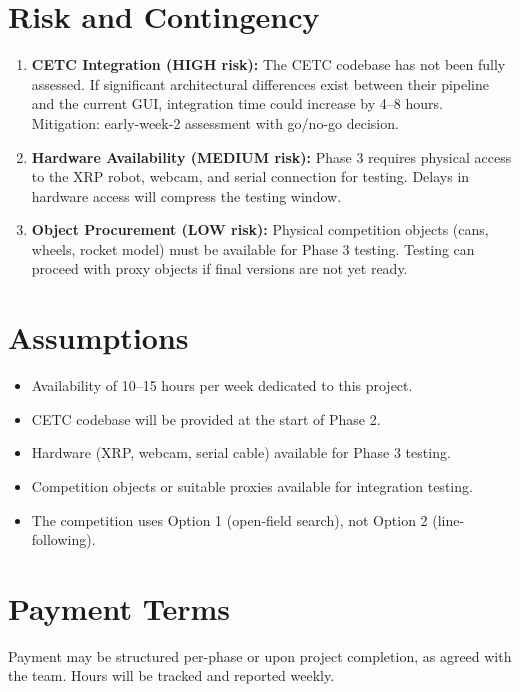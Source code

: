 \documentclass[a4paper]{article}
\begin{document}
\section*{Risk and Contingency}

\begin{enumerate}[leftmargin=*]
    \item \textbf{CETC Integration (HIGH risk):} The CETC codebase has not been fully assessed. If significant architectural differences exist between their pipeline and the current GUI, integration time could increase by 4--8 hours. Mitigation: early-week-2 assessment with go/no-go decision.

    \item \textbf{Hardware Availability (MEDIUM risk):} Phase 3 requires physical access to the XRP robot, webcam, and serial connection for testing. Delays in hardware access will compress the testing window.

    \item \textbf{Object Procurement (LOW risk):} Physical competition objects (cans, wheels, rocket model) must be available for Phase 3 testing. Testing can proceed with proxy objects if final versions are not yet ready.
\end{enumerate}

\section*{Assumptions}

\begin{itemize}
    \item Availability of 10--15 hours per week dedicated to this project.
    \item CETC codebase will be provided at the start of Phase 2.
    \item Hardware (XRP, webcam, serial cable) available for Phase 3 testing.
    \item Competition objects or suitable proxies available for integration testing.
    \item The competition uses Option 1 (open-field search), not Option 2 (line-following).
\end{itemize}

\section*{Payment Terms}

Payment may be structured per-phase or upon project completion, as agreed with the team. Hours will be tracked and reported weekly.
\end{document}
